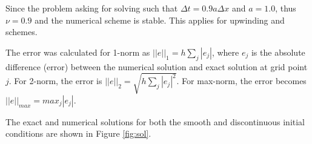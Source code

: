 Since the problem asking for solving such that $\Delta t =0.9a\Delta x$ and $a=1.0$, thus $\nu=0.9$ and the numerical scheme is stable. This applies for upwinding and \protect{\lw} schemes. 

The error was calculated for 1-norm as $||e||_{1} = h\sum_{j}|e_{j}|$, where $e_{j}$ is the absolute difference (error) between the numerical solution and exact solution at grid point $j$. For 2-norm, the error is $||e||_{2} = \sqrt{h\sum_{j}|e_{j}|^2}$. For max-norm, the error becomes $||e||_{max}=max_{j}|e_{j}|$. 

The exact and numerical solutions for both the smooth and discontinuous initial conditions are shown in Figure \ref{fig:sol}.

\begin{figure}[!tbh]
 \centering     
   

\end{figure}
